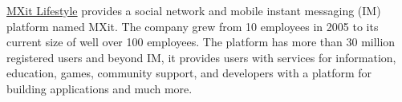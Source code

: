 \documentclass[10pt,a4paper,final]{columncv}
\begin{document}
\pagebreak


\noindent \href{http://www.mxit.com/}{MXit Lifestyle} provides a social network and mobile 
		  instant messaging (IM) platform named MXit. The 
          company grew from 10 employees in 2005 to its current size of well over 100 
          employees. The platform has more than 30 million registered users and beyond IM,
          it provides users with services for information, education, games, community 
          support, and developers with a platform for building applications and much more. 
\\[-3em]
\end{document}
